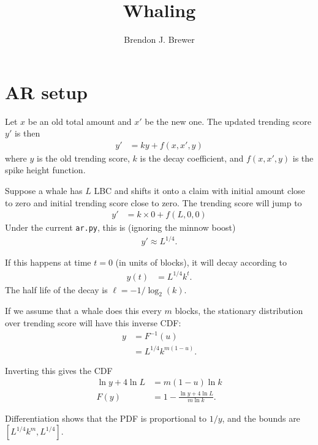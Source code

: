 \documentclass[a4paper, 12pt]{article}
\title{Whaling}
\author{Brendon J. Brewer}
\date{}
\begin{document}
\maketitle


\setlength{\parindent}{0pt}
\setlength{\parskip}{8pt}

\section{AR setup}
Let $x$ be an old total amount and $x'$ be the new one. The updated trending
score $y'$ is then
\begin{align}
y' &= ky + f(x, x', y)
\end{align}
where $y$ is the old trending score, $k$ is the decay coefficient, and
$f(x, x', y)$ is the spike height function.

Suppose a whale has $L$ LBC and shifts it onto a claim with initial amount
close to zero and initial trending score close to zero.
The trending score will jump to
\begin{align}
y' &= k \times 0 + f(L, 0, 0)
\end{align}
Under the current {\tt ar.py}, this is (ignoring the minnow boost)
\begin{align}
y' \approx L^{1/4}.
\end{align}

If this happens at time $t=0$ (in units of blocks), it will decay according to
\begin{align}
y(t) &= L^{1/4} k^t. \label{eqn:decay}
\end{align}
The half life of the decay is $\ell = -1/\log_2(k)$.

If we assume that a whale
does this every $m$ blocks, the stationary distribution over trending score
will have this inverse CDF:
\begin{align}
y &= F^{-1}(u) \\
  &= L^{1/4} k^{m(1-u)}.
\end{align}

Inverting this gives the CDF
\begin{align}
\ln y + 4 \ln L &= m(1-u)\ln k \\
F(y) &= 1 - \frac{\ln y + 4 \ln L}{m \ln k}.
\end{align}

Differentiation shows that the PDF is proportional to
$1/y$, and the bounds are $[L^{1/4}k^m, L^{1/4}]$.
\end{document}
